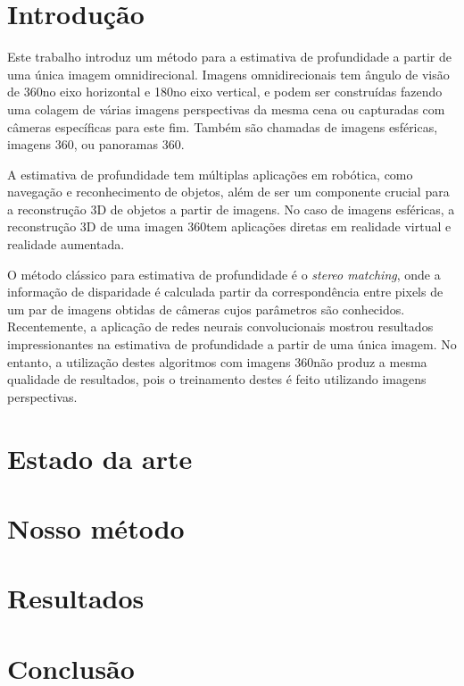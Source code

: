 \documentclass[cic,tc]{iiufrgs}
\begin{document}
\tableofcontents


\chapter{Introdução}

Este trabalho introduz um método para a estimativa de profundidade a partir de uma única imagem omnidirecional. Imagens omnidirecionais tem ângulo de visão de 360\degree no eixo horizontal e 180\degree no eixo vertical, e podem ser construídas fazendo uma colagem de várias imagens perspectivas da mesma cena ou capturadas com câmeras específicas para este fim. Também são chamadas de imagens esféricas, imagens 360\degree, ou panoramas 360\degree.

A estimativa de profundidade tem múltiplas aplicações em robótica, como navegação e reconhecimento de objetos, além de ser um componente crucial para a reconstrução 3D de objetos a partir de imagens. No caso de imagens esféricas, a reconstrução 3D de uma imagen 360\degree tem aplicações diretas em realidade virtual e realidade aumentada.

O método clássico para estimativa de profundidade é o \textit{stereo matching}, onde a informação de disparidade é calculada partir da correspondência entre pixels de um par de imagens obtidas de câmeras cujos parâmetros são conhecidos. Recentemente, a aplicação de redes neurais convolucionais mostrou resultados impressionantes na estimativa de profundidade a partir de uma única imagem. No entanto, a utilização destes algoritmos com imagens 360\degree não produz a mesma qualidade de resultados, pois o treinamento destes é feito utilizando imagens perspectivas.



%
\chapter{Estado da arte}
\chapter{Nosso método}
\chapter{Resultados}
\chapter{Conclusão}

%



\end{document}
